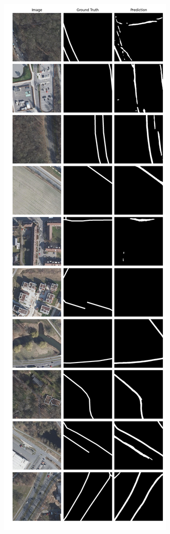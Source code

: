 \begin{figure}[H]
	\centering
	\begin{subfigure}{.4\textwidth}
		\centering
		\includegraphics[width=1.\textwidth]{Bilder/wolfsburg-color-samples/rbunet-l.png}

\end{subfigure}
\end{figure}
